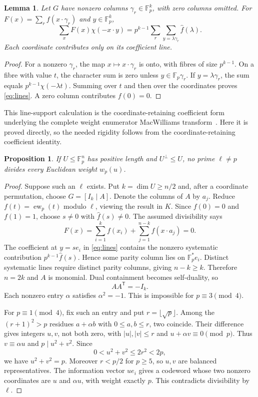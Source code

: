 \documentclass[12pt,letterpaper,onecolumn]{article}
\newtheorem{lemma}[theorem]{Lemma}
\newtheorem{proposition}[theorem]{Proposition}
\newcommand{\F}{\mathbb{F}}
\newcommand{\ew}{\operatorname{ew}}
\begin{document}
\begin{lemma}\label{lem:line}
Let $G$ have nonzero columns $\gamma_r\in\F_p^k$, with zero columns omitted. For $F(x)=\sum_r f(x\cdot\gamma_r)$ and $y\in\F_p^k$,
\begin{equation}
 \sum_x F(x)\chi(-x\cdot y)
 =p^{k-1}\sum_r\sum_{y=\lambda\gamma_r}\widehat f(\lambda).
 \label{eq:lines}
\end{equation}
Each coordinate contributes only on its coefficient line.
\end{lemma}
\begin{proof}
For a nonzero $\gamma_r$, the map $x\mapsto x\cdot\gamma_r$ is onto, with fibres of size $p^{k-1}$. On a fibre with value $t$, the character sum is zero unless $y\in\F_p\gamma_r$. If $y=\lambda\gamma_r$, the sum equals $p^{k-1}\chi(-\lambda t)$. Summing over $t$ and then over the coordinates proves \eqref{eq:lines}. A zero column contributes $f(0)=0$.
\end{proof}

This line-support calculation is the coordinate-retaining coefficient form underlying the complete weight enumerator MacWilliams transform~\cite{Wood2009}. Here it is proved directly, so the needed rigidity follows from the coordinate-retaining coefficient identity.

\begin{proposition}\label{prop:foreign}
If $U\le\F_p^n$ has positive length and $U^\perp\le U$, no prime $\ell\ne p$ divides every Euclidean weight $w_p(u)$.
\end{proposition}
\begin{proof}
Suppose such an $\ell$ exists. Put $k=\dim U\ge n/2$ and, after a coordinate permutation, choose $G=[I_k\mid A]$. Denote the columns of $A$ by $a_j$. Reduce $f(t)=\ew_p(t)$ modulo $\ell$, viewing the result in $K$. Since $f(0)=0$ and $f(1)=1$, choose $s\ne0$ with $\widehat f(s)\ne0$. The assumed divisibility says
\[
 F(x)=\sum_{i=1}^k f(x_i)+\sum_{j=1}^{n-k}f(x\cdot a_j)=0.
\]
The coefficient at $y=se_i$ in \eqref{eq:lines} contains the nonzero systematic contribution $p^{k-1}\widehat f(s)$. Hence some parity column lies on $\F_p^*e_i$. Distinct systematic lines require distinct parity columns, giving $n-k\ge k$. Therefore $n=2k$ and $A$ is monomial. Dual containment becomes self-duality, so
\begin{equation}
 AA^{\mathsf T}=-I_k.
 \label{eq:monomial}
\end{equation}
Each nonzero entry $\alpha$ satisfies $\alpha^2=-1$. This is impossible for $p\equiv3\pmod4$.

For $p\equiv1\pmod4$, fix such an entry and put $r=\lfloor\sqrt p\rfloor$. Among the $(r+1)^2>p$ residues $a+\alpha b$ with $0\le a,b\le r$, two coincide. Their difference gives integers $u,v$, not both zero, with $|u|,|v|\le r$ and $u+\alpha v\equiv0\pmod p$. Thus $v\equiv\alpha u$ and $p\mid u^2+v^2$. Since
\[
 0<u^2+v^2\le2r^2<2p,
\]
we have $u^2+v^2=p$. Moreover $r<p/2$ for $p\ge5$, so $u,v$ are balanced representatives. The information vector $ue_i$ gives a codeword whose two nonzero coordinates are $u$ and $\alpha u$, with weight exactly $p$. This contradicts divisibility by $\ell$.
\end{proof}
\end{document}
